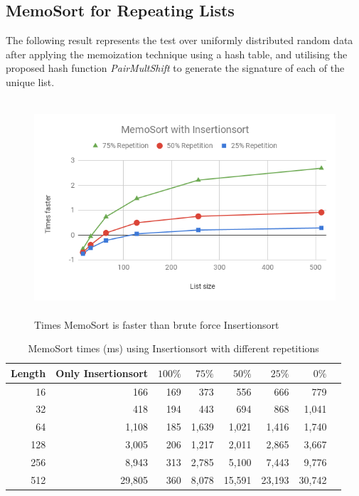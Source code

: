 \documentclass[a4paper,12pt]{article}
\begin{document}
\subsection{MemoSort for Repeating Lists}

The following result represents the test over uniformly distributed random data after applying the memoization technique using a hash table, and utilising the proposed hash function {\it PairMultShift}  to generate the signature of each of the unique list. \\

\begin{figure}[H]
    \centering
    \includegraphics[height=8cm,keepaspectratio]{./images/MemoSortIns.png}
    \caption{Times MemoSort is faster than brute force Insertionsort }
    \label{fig:MemoSortInsGraph}
\end{figure}

\begin{table}[H]
\centering
\begin{tabular}{|r|r|r|r|r|r|r|r|}   \hline
	{Length} & {Only Insertionsort} & {$100\%$} & {$75\%$} & {$50\%$} & {$25\%$} & {$0\%$} \\  \hline
	16 &166&169&373 & 556 & 666 & 779\\ 
	32 &418&194&443 & 694& 868& 1,041\\ 
	64 &1,108&185 &1,639&1,021&1,416& 1,740\\ 
	128 &3,005&206&1,217&2,011&2,865 &3,667\\ 
	256 &8,943&313&2,785 &5,100&7,443&9,776\\ 
	512 &29,805 & 360&8,078 &15,591 &23,193 &30,742\\  \hline
\end{tabular}
\caption{MemoSort times (ms) using Insertionsort with different repetitions}
\label{fig:MemoSortInsTable}
\end{table}
\end{document}
